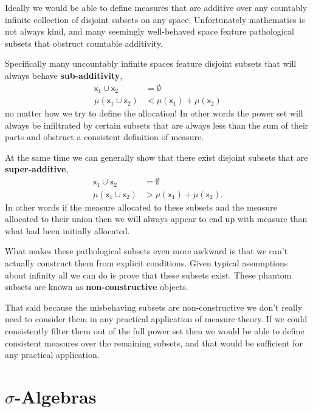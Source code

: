 \documentclass[
  letterpaper,
  DIV=11,
  numbers=noendperiod]{scrartcl}
\begin{document}
Ideally we would be able to define measures that are additive over any
countably infinite collection of disjoint subsets on any space.
Unfortunately mathematics is not always kind, and many seemingly
well-behaved space feature pathological subsets that obstruct countable
additivity.

Specifically many uncountably infinite spaces feature disjoint subsets
that will always behave \textbf{sub-additivity}, \begin{align*}
\mathsf{x}_{1} \cup \mathsf{x}_{2} &= \emptyset
\\
\mu( \mathsf{x}_{1} \cup \mathsf{x}_{2} )
&<
\mu( \mathsf{x}_{1}) + \mu( \mathsf{x}_{2} )
\end{align*} no matter how we try to define the allocation! In other
words the power set will always be infiltrated by certain subsets that
are always less than the sum of their parts and obstruct a consistent
definition of measure.

At the same time we can generally show that there exist disjoint subsets
that are \textbf{super-additive}, \begin{align*}
\mathsf{x}_{1} \cup \mathsf{x}_{2} &= \emptyset
\\
\mu( \mathsf{x}_{1} \cup \mathsf{x}_{2} )
&>
\mu( \mathsf{x}_{1}) + \mu( \mathsf{x}_{2} ).
\end{align*} In other words if the measure allocated to these subsets
and the measure allocated to their union then we will always appear to
end up with measure than what had been initially allocated.

What makes these pathological subsets even more awkward is that we can't
actually construct them from explicit conditions. Given typical
assumptions about infinity all we can do is prove that these subsets
exist. These phantom subsets are known as \textbf{non-constructive}
objects.

That said because the misbehaving subsets are non-constructive we don't
really need to consider them in any practical application of measure
theory. If we could consistently filter them out of the full power set
then we would be able to define consistent measures over the remaining
subsets, and that would be sufficient for any practical application.

\hypertarget{sigma-algebras}{%
\section{\texorpdfstring{{\(\sigma\)}-Algebras}{\textbackslash sigma-Algebras}}\label{sigma-algebras}}
\end{document}
